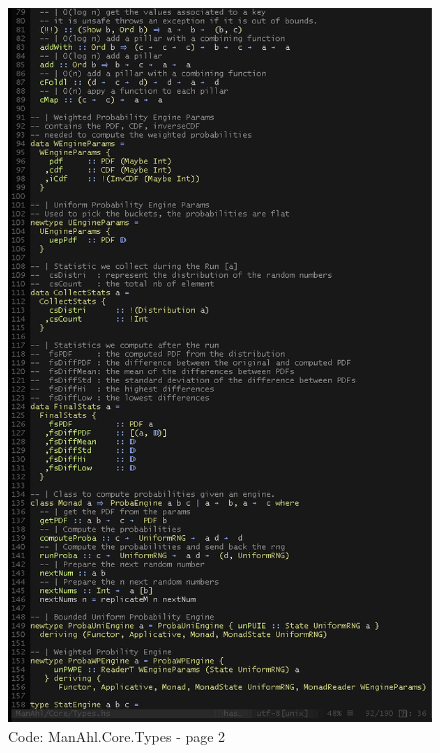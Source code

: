 \documentclass[12pt,a4paper,article]{memoir} %
\begin{document}
\begin{figure}[h!]
\centering
\includegraphics[width=1\textwidth]{img/code-types-2.png}
\caption{Code: ManAhl.Core.Types - page 2}
\label{fig:core.types2}
\end{figure}
\end{document}
